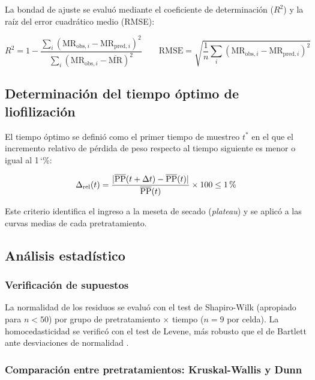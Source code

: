 \documentclass[12pt, a4paper]{article}
\newcommand{\pct}{\char`\%}
\begin{document}
La bondad de ajuste se evaluó mediante el coeficiente de determinación ($R^2$) y la raíz del error cuadrático medio (RMSE):

\begin{equation}
    R^2 = 1 - \frac{\displaystyle\sum_{i}(\text{MR}_{\text{obs},i} - \text{MR}_{\text{pred},i})^2}{\displaystyle\sum_{i}(\text{MR}_{\text{obs},i} - \overline{\text{MR}})^2}
    \qquad
    \text{RMSE} = \sqrt{\frac{1}{n}\sum_{i}(\text{MR}_{\text{obs},i} - \text{MR}_{\text{pred},i})^2}
    \label{eq:R2RMSE}
\end{equation}

\subsection{Determinación del tiempo óptimo de liofilización}

El tiempo óptimo se definió como el primer tiempo de muestreo $t^*$ en el que el incremento relativo de pérdida de peso respecto al tiempo siguiente es menor o igual al 1\,\pct{}:

\begin{equation}
    \Delta_{\text{rel}}(t) = \frac{|\overline{\text{PP}}(t+\Delta t) - \overline{\text{PP}}(t)|}{\overline{\text{PP}}(t)} \times 100 \leq 1\,\pct{}
    \label{eq:plateau}
\end{equation}

\noindent Este criterio identifica el ingreso a la meseta de secado (\textit{plateau}) y se aplicó a las curvas medias de cada pretratamiento.

\subsection{Análisis estadístico}

\subsubsection{Verificación de supuestos}

La normalidad de los residuos se evaluó con el test de Shapiro-Wilk (apropiado para $n < 50$) por grupo de pretratamiento $\times$ tiempo ($n = 9$ por celda). La homocedasticidad se verificó con el test de Levene, más robusto que el de Bartlett ante desviaciones de normalidad \citep{brown1974}.

\subsubsection{Comparación entre pretratamientos: Kruskal-Wallis y Dunn}
\end{document}
